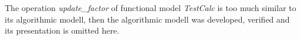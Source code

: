 \documentclass[11pt]{article} %
\begin{document}

The operation \textit{update\_factor} of functional model \textit{TestCalc} is
too much similar to its algorithmic modell, then the algorithmic modell was
developed, verified and its presentation is omitted here.


% 
% 
% 
% 
% 
% 
% 
% 
% 
% 

\end{document}
